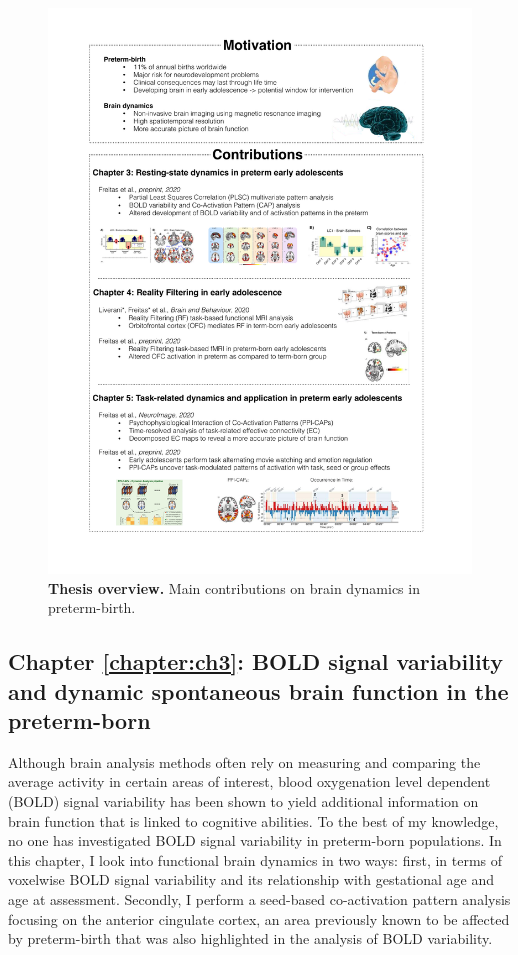 \begin{figure}[h!]
\centering\includegraphics[width=0.95\linewidth]{images/Ch1/Overview.pdf}
\caption{\textbf{Thesis overview.} Main contributions on brain dynamics in preterm-birth. } \label{fig:overview}
\end{figure}


\subsection*{Chapter \ref{chapter:ch3}: BOLD signal variability and dynamic spontaneous brain function in the preterm-born}
Although brain analysis methods often rely on measuring and comparing the average activity in certain areas of interest, blood oxygenation level dependent (BOLD) signal variability has been shown to yield additional information on brain function that is linked to cognitive abilities.
To the best of my knowledge, no one has investigated BOLD signal variability in preterm-born populations. In this chapter, I look into functional brain dynamics in two ways: first, in terms of voxelwise BOLD signal variability and its relationship with gestational age and age at assessment. Secondly, I perform a seed-based co-activation pattern analysis focusing on the anterior cingulate cortex, an area previously known to be affected by preterm-birth that was also highlighted in the analysis of BOLD variability. 

